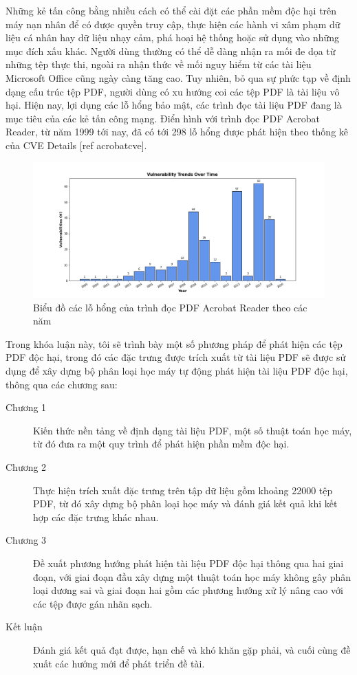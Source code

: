 \documentclass[./../main.tex]{subfiles}
\begin{document}
Những kẻ tấn công bằng nhiều cách có thể cài đặt các phần mềm độc hại trên máy nạn nhân để có được quyền truy cập, thực hiện các hành vi xâm phạm dữ liệu cá nhân hay dữ liệu nhạy cảm, phá hoại hệ thống hoặc sử dụng vào những mục đích xấu khác. Người dùng thường có thể dễ dàng nhận ra mối đe dọa từ những tệp thực thi, ngoài ra nhận thức về mối nguy hiểm từ các tài liệu Microsoft Office cũng ngày càng tăng cao. Tuy nhiên, bỏ qua sự phức tạp về định dạng cấu trúc tệp PDF, người dùng có xu hướng coi các tệp PDF là tài liệu vô hại.
Hiện nay, lợi dụng các lỗ hổng bảo mật, các trình đọc tài liệu PDF đang là mục tiêu của các kẻ tấn công mạng. Điển hình với trình đọc PDF Acrobat Reader, từ năm 1999 tới nay, đã có tới 298 lỗ hổng được phát hiện theo thống kê của CVE Details [ref acrobatcve].

\begin{figure}[ht!]
	\includegraphics[width=\linewidth]{./images/VulPerTime.png}
	\caption{Biểu đồ các lỗ hổng của trình đọc PDF Acrobat Reader theo các năm}
	\label{fig:acrobatcve}
\end{figure}

Trong khóa luận này, tôi sẽ trình bày một số phương pháp để phát hiện các tệp PDF độc hại, trong đó các đặc trưng được trích xuất từ tài liệu PDF sẽ được sử dụng để xây dựng bộ phân loại học máy tự động phát hiện tài liệu PDF độc hại, thông qua các chương sau:
\begin{description}
	\item [Chương 1] Kiến thức nền tảng về định dạng tài liệu PDF, một số thuật toán học máy, từ đó đưa ra một quy trình để phát hiện phần mềm độc hại.
	\item [Chương 2] Thực hiện trích xuất đặc trưng trên tập dữ liệu gồm khoảng 22000 tệp PDF, từ đó xây dựng bộ phân loại học máy và đánh giá kết quả khi kết hợp các đặc trưng khác nhau.
	\item [Chương 3] Đề xuất phương hướng phát hiện tài liệu PDF độc hại thông qua hai giai đoạn, với giai đoạn đầu xây dựng một thuật toán học máy không gây phân loại dương sai và giai đoạn hai gồm các phương hướng xử lý nâng cao với các tệp được gán nhãn sạch.
	\item [Kết luận] Đánh giá kết quả đạt được, hạn chế và khó khăn gặp phải, và cuối cùng đề xuất các hướng mới để phát triển đề tài.
\end{description}
\end{document}

